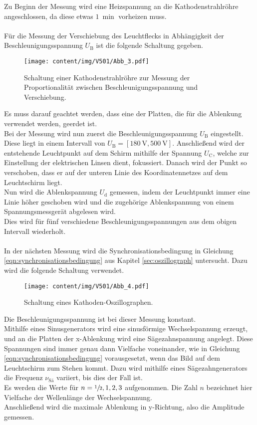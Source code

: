     Zu Beginn der Messung wird eine Heizspannung an die Kathodenstrahlröhre angeschlossen,
    da diese etwas $\SI{1}{\min}$ vorheizen muss.\\
    \\
    Für die Messung der Verschiebung des Leuchtflecks in Abhängigkeit der Beschleunigungsspannung $U_\text{B}$ ist die folgende Schaltung gegeben.
    \begin{figure}[H]
        \centering
        \texttt{[image: content/img/V501/Abb\_3.pdf]}
        \caption{Schaltung einer Kathodenstrahlröhre zur Messung der Proportionalität zwischen Beschleunigungsspannung und Verschiebung.}
        \label{fig:schaltung_kathodenstrahlröhre}
    \end{figure}
    Es muss darauf geachtet werden,
    dass eine der Platten,
    die für die Ablenkung verwendet werden,
    geerdet ist.\\
    Bei der Messung wird nun zuerst die Beschleunigungsspannung $U_\text{B}$ eingestellt.
    Diese liegt in einem Intervall von $U_\text{B} = [\SI{180}{\volt},\SI{500}{\volt}]$.
    Anschließend wird der entstehende Leuchtpunkt auf dem Schirm mithilfe der Spannung $U_\text{C}$,
    welche zur Einstellung der elektrischen Linsen dient,
    fokussiert.
    Danach wird der Punkt so verschoben,
    dass er auf der unteren Linie des Koordinatennetzes auf dem Leuchtschirm liegt.\\
    Nun wird die Ablenkspannung $U_\text{d}$ gemessen,
    indem der Leuchtpunkt immer eine Linie höher geschoben wird und die zugehörige Ablenkspannung von einem Spannungsmessgerät abgelesen wird.\\
    Dies wird für fünf verschiedene Beschleunigungsspannungen aus dem obigen Intervall wiederholt.\\
    \\
    In der nächsten Messung wird die Synchronisationsbedingung in Gleichung \ref{eqn:synchronisationsbedingung} aus Kapitel \ref{sec:oszillograph} untersucht.
    Dazu wird die folgende Schaltung verwendet.
    \begin{figure}[H]
        \centering
        \texttt{[image: content/img/V501/Abb\_4.pdf]}
        \caption{Schaltung eines Kathoden-Oszillographen.}
        \label{fig:schaltung_oszillograph}
    \end{figure}
    Die Beschleunigungsspannung ist bei dieser Messung konstant.\\
    Mithilfe eines Sinusgenerators wird eine sinusförmige Wechselspannung erzeugt,
    und an die Platten der x-Ablenkung wird eine Sägezahnspannung angelegt.
    Diese Spannungen sind immer genau dann Vielfache voneinander,
    wie in Gleichung \ref{eqn:synchronisationsbedingung} vorausgesetzt,
    wenn das Bild auf dem Leuchtschirm zum Stehen kommt.
    Dazu wird mithilfe eines Sägezahngenerators die Frequenz $\nu_\text{Sä}$ variiert,
    bis dies der Fall ist.\\
    Es werden die Werte für $n = \sfrac{1}{2}, 1, 2, 3$ aufgenommen.
    Die Zahl $n$ bezeichnet hier Vielfache der Wellenlänge der Wechselspannung.\\
    Anschließend wird die maximale Ablenkung in y-Richtung,
    also die Amplitude gemessen.

